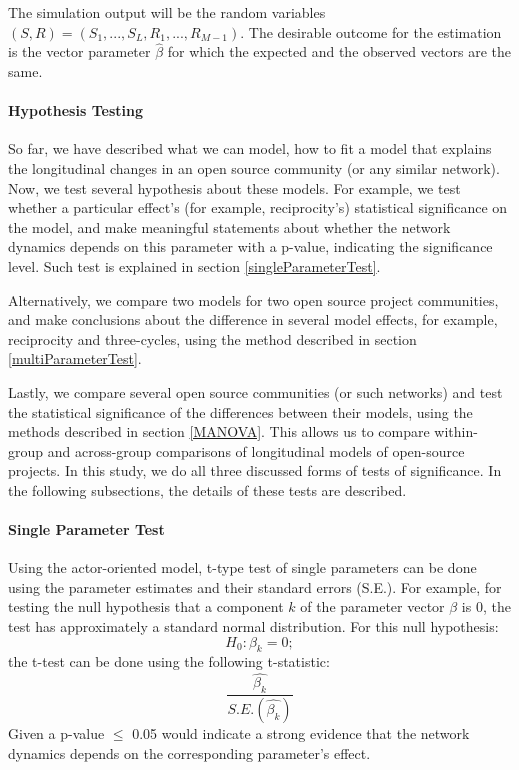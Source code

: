 \documentclass[12pt]{report}
\begin{document}
The simulation output will be the random variables $(S,R) = (S_1,...,S_L,R_1,...,R_{M-1})$. The desirable outcome for the estimation is the vector parameter $\hat{\beta}$ for which the expected and the observed vectors are the same. 

\paragraph*{Hypothesis Testing}
So far, we have described what we can model, how to fit a model that explains the longitudinal changes in an open source community (or any similar network). Now, we test several hypothesis about these models. For example, we test whether a particular effect's (for example, reciprocity's) statistical significance on the model, and make meaningful statements about whether the network dynamics depends on this parameter with a p-value, indicating the significance level. Such test is explained in section \ref{singleParameterTest}.

Alternatively, we compare two models for two open source project communities, and make conclusions about the difference in several model effects, for example, reciprocity and three-cycles, using the method described in section \ref{multiParameterTest}. 

Lastly, we compare several open source communities (or such networks) and test the statistical significance of the differences between their models, using the methods described in section \ref{MANOVA}. This allows us to compare within-group and across-group comparisons of longitudinal models of open-source projects. In this study, we do all three discussed forms of tests of significance. In the following subsections, the details of these tests are described.   

\paragraph*{Single Parameter Test}
\label{singleParameterTest}
Using the actor-oriented model, t-type test of single parameters can be done using the parameter estimates and their standard errors (S.E.). 
For example, for testing the null hypothesis that a component $k$ of the parameter vector $\beta$ is 0, the test has approximately a standard normal distribution. For this null hypothesis: 
\begin{equation}
H_0: \beta_k = 0;
\end{equation}
the t-test can be done using the following t-statistic:
\begin{equation}
\frac{\hat{\beta_k}}{S.E.(\hat{\beta_k})}
\end{equation}
Given a p-value $\leq$ 0.05 would indicate a strong evidence that the network dynamics depends on the corresponding parameter's effect. 
\end{document}
